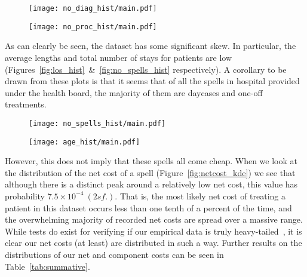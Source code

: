 \begin{figure}[h!]
    \centering
    \begin{minipage}{.495\textwidth}
        \texttt{[image: no\_diag\_hist/main.pdf]}
        \label{fig:no_diag_hist}
    \end{minipage}\hfill%
    \begin{minipage}{.495\textwidth}
        \texttt{[image: no\_proc\_hist/main.pdf]}
        \label{fig:no_proc_hist}
    \end{minipage}
\end{figure}

As can clearly be seen, the dataset has some significant skew. In particular,
the average lengths and total number of stays for patients are low
(Figures~\ref{fig:los_hist}~\&~\ref{fig:no_spells_hist} respectively). A
corollary to be drawn from these plots is that it seems that of all the spells
in hospital provided under the health board, the majority of them are daycases
and one-off treatments.

\begin{figure}[h!]
    \centering
    \begin{minipage}{.495\textwidth}
        \texttt{[image: no\_spells\_hist/main.pdf]}
        \label{fig:no_spells_hist}
    \end{minipage}\hfill%
    \begin{minipage}{.495\textwidth}
        \texttt{[image: age\_hist/main.pdf]}
        \label{fig:age_hist}
    \end{minipage}
\end{figure}

However, this does not imply that these spells all come cheap. When we look at
the distribution of the net cost of a spell (Figure~\ref{fig:netcost_kde}) we
see that although there is a distinct peak around a relatively low net cost,
this value has probability \(7.5\times10^{-4}\ (2 sf.)\). That is, the most
likely net cost of treating a patient in this dataset occurs less than one tenth
of a percent of the time, and the overwhelming majority of recorded net costs
are spread over a massive range. While tests do exist for verifying if our
empirical data is truly heavy-tailed~\cite{Bryson1974}, it is clear our net
costs (at least) are distributed in such a way. Further results on the
distributions of our net and component costs can be seen in
Table~\ref{tab:summative}.

